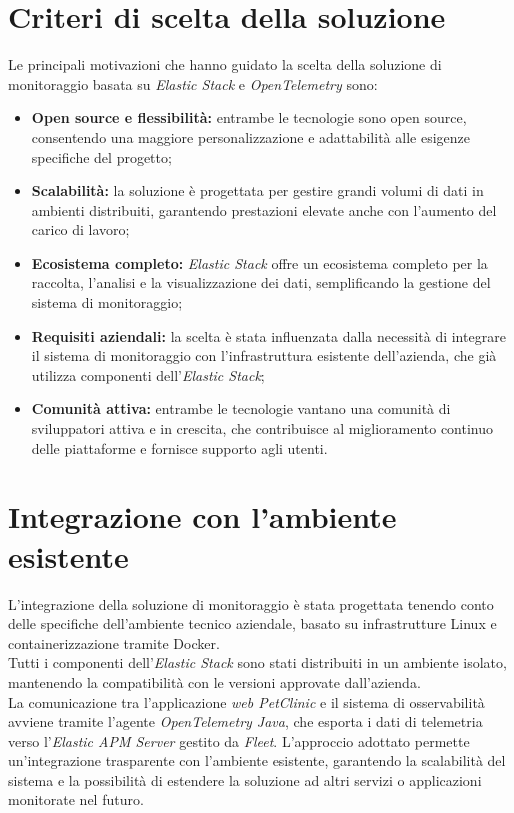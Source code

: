 \newpage
\section{Criteri di scelta della soluzione}
\label{sec:criteri-scelta-soluzione}
Le principali motivazioni che hanno guidato la scelta della soluzione di monitoraggio basata su \emph{Elastic Stack} e \emph{OpenTelemetry} sono:
\begin{itemize}
    \item \textbf{Open source e flessibilità:} entrambe le tecnologie sono open source, consentendo una maggiore personalizzazione e adattabilità alle esigenze specifiche del progetto;
    \item \textbf{Scalabilità:} la soluzione è progettata per gestire grandi volumi di dati in ambienti distribuiti, garantendo prestazioni elevate anche con l'aumento del carico di lavoro;
    \item \textbf{Ecosistema completo:} \emph{Elastic Stack} offre un ecosistema completo per la raccolta, l'analisi e la visualizzazione dei dati, semplificando la gestione del sistema di monitoraggio;
    \item \textbf{Requisiti aziendali:} la scelta è stata influenzata dalla necessità di integrare il sistema di monitoraggio con l'infrastruttura esistente dell'azienda, che già utilizza componenti dell'\emph{Elastic Stack};
    \item \textbf{Comunità attiva:} entrambe le tecnologie vantano una comunità di sviluppatori attiva e in crescita, che contribuisce al miglioramento continuo delle piattaforme e fornisce supporto agli utenti.
\end{itemize}


\section{Integrazione con l'ambiente esistente}
\label{sec:integrazione-ambiente-esistente}
L'integrazione della soluzione di monitoraggio è stata progettata tenendo conto delle specifiche dell'ambiente tecnico aziendale, basato su infrastrutture Linux e containerizzazione tramite Docker. \\
Tutti i componenti dell'\emph{Elastic Stack} sono stati distribuiti in un ambiente isolato, mantenendo la compatibilità con le versioni approvate dall'azienda. \\
La comunicazione tra l'applicazione \emph{web PetClinic} e il sistema di osservabilità avviene tramite l'agente \emph{OpenTelemetry Java}, che esporta i dati di telemetria verso l'\emph{Elastic APM Server} gestito da \emph{Fleet}. 
L'approccio adottato permette un'integrazione trasparente con l'ambiente esistente, garantendo la scalabilità del sistema e la possibilità di estendere la soluzione ad altri servizi o applicazioni monitorate nel futuro.

